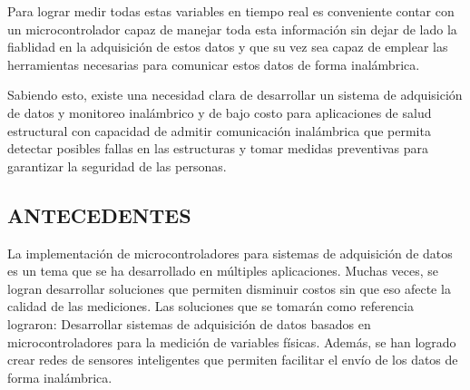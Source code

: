 \documentclass[12pt,letterpaper]{article}
\begin{document}
Para lograr medir todas estas variables en tiempo real es conveniente contar con un microcontrolador capaz de manejar toda esta información sin dejar de lado la fiablidad en la adquisición de estos datos y que su vez sea capaz de emplear las herramientas necesarias para comunicar estos datos de forma inalámbrica.

Sabiendo esto, existe una necesidad clara de desarrollar un sistema de adquisición de datos y monitoreo inalámbrico y de bajo costo para aplicaciones de salud estructural con capacidad de admitir comunicación inalámbrica que permita detectar posibles fallas en las estructuras y tomar medidas preventivas para garantizar la seguridad de las personas.


\newpage


\begin{center}
	\section*{ANTECEDENTES}
\end{center}

\vspace{1cm}

La implementación de microcontroladores para sistemas de adquisición de datos es un tema que se ha desarrollado en múltiples aplicaciones. Muchas veces, se logran desarrollar soluciones que permiten disminuir costos sin que eso afecte la calidad de las mediciones. Las soluciones que se tomarán como referencia lograron: Desarrollar sistemas de adquisición de datos basados en microcontroladores para la medición de variables físicas. Además, se han logrado crear redes de sensores inteligentes que permiten facilitar el envío de los datos de forma inalámbrica.

\end{document}
